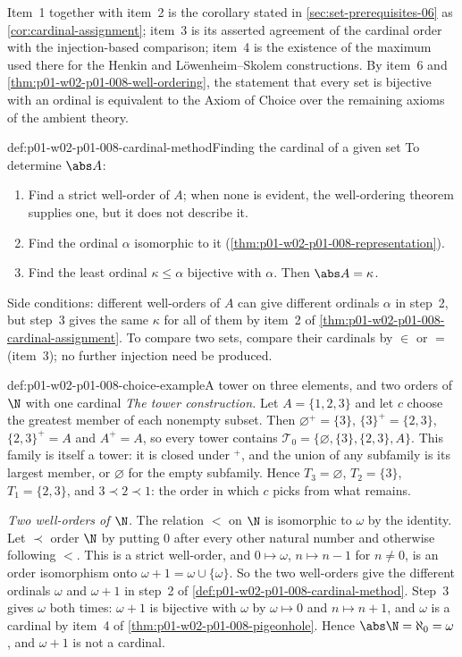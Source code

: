 Item~1 together with item~2 is the corollary stated in
\cref{sec:set-prerequisites-06} as \cref{cor:cardinal-assignment}; item~3 is
its asserted agreement of the cardinal order with the injection-based
comparison; item~4 is the existence of the maximum used there for the Henkin
and L\"owenheim--Skolem constructions. By item~6 and
\cref{thm:p01-w02-p01-008-well-ordering}, the statement that every set is
bijective with an ordinal is equivalent to the Axiom of Choice over the
remaining axioms of the ambient theory.

\begin{hbmethod}{def:p01-w02-p01-008-cardinal-method}{Finding the cardinal of a given set}
To determine \(\abs A\):
\begin{enumerate}
  \item Find a strict well-order of \(A\); when none is evident, the
        well-ordering theorem supplies one, but it does not describe it.
  \item Find the ordinal \(\alpha\) isomorphic to it
        (\cref{thm:p01-w02-p01-008-representation}).
  \item Find the least ordinal \(\kappa\leq\alpha\) bijective with
        \(\alpha\). Then \(\abs A=\kappa\).
\end{enumerate}
Side conditions: different well-orders of \(A\) can give different ordinals
\(\alpha\) in step~2, but step~3 gives the same \(\kappa\) for all of them by
item~2 of \cref{thm:p01-w02-p01-008-cardinal-assignment}. To compare two
sets, compare their cardinals by \(\in\) or \(=\) (item~3); no further
injection need be produced.
\end{hbmethod}

\begin{hbexample}{def:p01-w02-p01-008-choice-example}{A tower on three elements, and two orders of \(\N\) with one cardinal}
\emph{The tower construction.} Let \(A=\{1,2,3\}\) and let \(c\) choose the
greatest member of each nonempty subset. Then
\(\varnothing^{+}=\{3\}\), \(\{3\}^{+}=\{2,3\}\), \(\{2,3\}^{+}=A\) and
\(A^{+}=A\), so every tower contains
\(\mathcal T_0=\{\varnothing,\{3\},\{2,3\},A\}\). This family is itself a
tower: it is closed under \({}^{+}\), and the union of any subfamily is its
largest member, or \(\varnothing\) for the empty subfamily. Hence
\(T_3=\varnothing\), \(T_2=\{3\}\), \(T_1=\{2,3\}\), and
\(3\prec2\prec1\): the order in which \(c\) picks from what remains.

\emph{Two well-orders of \(\N\).} The relation \(<\) on \(\N\) is isomorphic
to \(\omega\) by the identity. Let \(\prec\) order \(\N\) by putting \(0\)
after every other natural number and otherwise following \(<\). This is a
strict well-order, and \(0\mapsto\omega\), \(n\mapsto n-1\) for \(n\neq0\),
is an order isomorphism onto \(\omega+1=\omega\cup\{\omega\}\). So the two
well-orders give the different ordinals \(\omega\) and \(\omega+1\) in
step~2 of \cref{def:p01-w02-p01-008-cardinal-method}. Step~3 gives
\(\omega\) both times: \(\omega+1\) is bijective with \(\omega\) by
\(\omega\mapsto0\) and \(n\mapsto n+1\), and \(\omega\) is a cardinal by
item~4 of \cref{thm:p01-w02-p01-008-pigeonhole}. Hence
\(\abs\N=\aleph_0=\omega\), and \(\omega+1\) is not a cardinal.
\end{hbexample}

